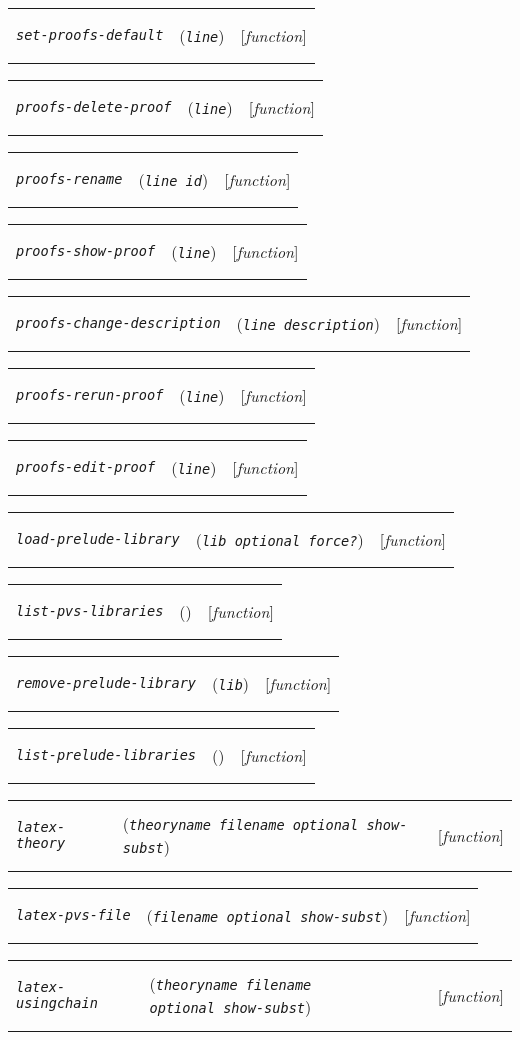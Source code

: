 \documentclass[12pt]{book}
\makeatletter
\def\ampoptional{{\smaller\sc {\smaller\smaller \&}optional\ }}
\newenvironment{function}[3]%
{\par\noindent\begin{boxedminipage}{\textwidth}%
 \par\noindent\begin{tabularx}{\linewidth}{l>{\raggedright}Xr}%
 \functionhtgt{#1}&(\texttt{\textit{#2}})&[\emph{#3}]%
 \end{tabularx}\par\flushright\begin{minipage}{.97\textwidth}}
{\end{minipage}\end{boxedminipage}}
\newcommand{\functionnm}[1]{\texttt{\textit{#1}}}
\newcommand{\functionhtgt}[1]{\hypertarget{#1}{\functionnm{#1}}\index{#1@\functionnm{#1}|underline}}
\newenvironment{lispfunction}[2]%
{\begin{function}{#1}{#2}{function}}{\end{function}}
\makeatother
\begin{document}
\begin{lispfunction}{set-proofs-default}{line}
\end{lispfunction}

\begin{lispfunction}{proofs-delete-proof}{line}
\end{lispfunction}

\begin{lispfunction}{proofs-rename}{line id}
\end{lispfunction}

\begin{lispfunction}{proofs-show-proof}{line}
\end{lispfunction}

\begin{lispfunction}{proofs-change-description}{line description}
\end{lispfunction}

\begin{lispfunction}{proofs-rerun-proof}{line}
\end{lispfunction}

\begin{lispfunction}{proofs-edit-proof}{line}
\end{lispfunction}

\begin{lispfunction}{load-prelude-library}{lib \ampoptional force?}
\end{lispfunction}

\begin{lispfunction}{list-pvs-libraries}{}
\end{lispfunction}

\begin{lispfunction}{remove-prelude-library}{lib}
\end{lispfunction}

\begin{lispfunction}{list-prelude-libraries}{}
\end{lispfunction}

\begin{lispfunction}{latex-theory}{theoryname filename \ampoptional show-subst}
\end{lispfunction}

\begin{lispfunction}{latex-pvs-file}{filename \ampoptional show-subst}
\end{lispfunction}

\begin{lispfunction}{latex-usingchain}
  {theoryname filename \ampoptional show-subst}
\end{lispfunction}
\end{document}
